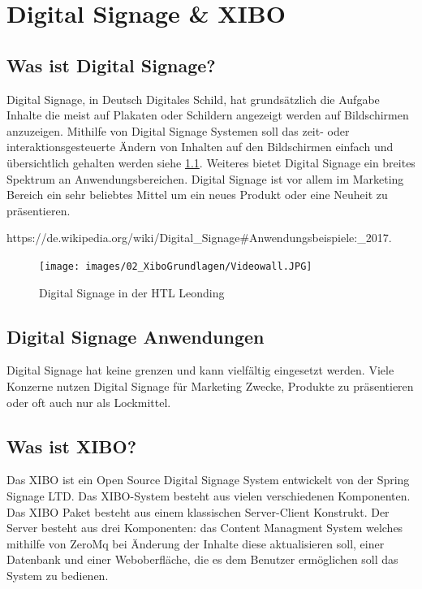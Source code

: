 \chapter{Digital Signage & XIBO}
\section{Was ist Digital Signage?}\label{sec:digitalsignage}
Digital Signage, in Deutsch Digitales Schild, hat grundsätzlich die Aufgabe Inhalte die meist auf Plakaten oder Schildern angezeigt werden auf Bildschirmen anzuzeigen. Mithilfe von Digital Signage Systemen soll das zeit- oder interaktionsgesteuerte Ändern von Inhalten auf den Bildschirmen einfach und übersichtlich gehalten werden siehe \ref{img:digitalsignagehtlleonding}. Weiteres bietet Digital Signage ein breites Spektrum an Anwendungsbereichen. Digital Signage ist vor allem im Marketing Bereich ein sehr beliebtes Mittel um ein neues Produkt oder eine Neuheit zu präsentieren. 

https://de.wikipedia.org/wiki/Digital_Signage#Anwendungsbeispiele:_2017.


\begin{figure}[h]
\centering
\texttt{[image: images/02\_XiboGrundlagen/Videowall.JPG]}
\caption{Digital Signage in der HTL Leonding}
\label{img:digitalsignagehtlleonding}
\end{figure}

\section{Digital Signage Anwendungen}\label{sec:anwendungedigitalsignage}
Digital Signage hat keine grenzen und kann vielfältig eingesetzt werden. Viele Konzerne nutzen Digital Signage für Marketing Zwecke, Produkte zu präsentieren oder oft auch nur als Lockmittel.

\section{Was ist XIBO?}\label{sec:xibo}
Das XIBO ist ein Open Source Digital Signage System entwickelt von der Spring Signage LTD. Das XIBO-System besteht aus vielen verschiedenen Komponenten. Das XIBO Paket besteht aus einem klassischen Server-Client Konstrukt. Der Server besteht aus drei Komponenten: das Content Managment System welches mithilfe von ZeroMq bei Änderung der Inhalte diese aktualisieren soll, einer Datenbank und einer Weboberfläche, die es dem Benutzer ermöglichen soll das System zu bedienen.

